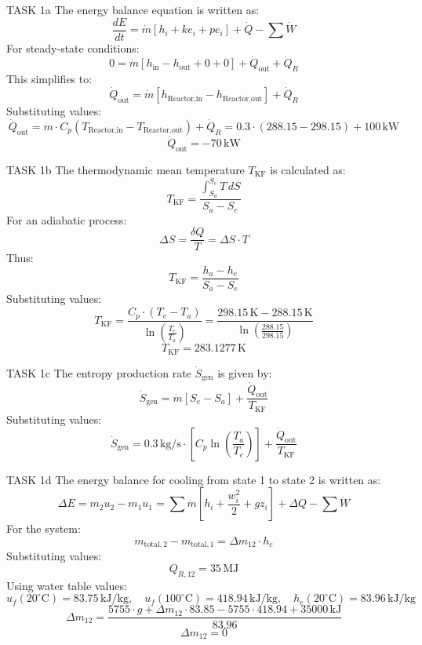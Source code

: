 TASK 1a  
The energy balance equation is written as:  
\[
\frac{dE}{dt} = \dot{m} \left[ h_i + ke_i + pe_i \right] + \dot{Q} - \sum \dot{W}
\]  
For steady-state conditions:  
\[
0 = \dot{m} \left[ h_{\text{in}} - h_{\text{out}} + 0 + 0 \right] + \dot{Q}_{\text{out}} + \dot{Q}_R
\]  
This simplifies to:  
\[
\dot{Q}_{\text{out}} = \dot{m} \left[ h_{\text{Reactor,in}} - h_{\text{Reactor,out}} \right] + \dot{Q}_R
\]  
Substituting values:  
\[
\dot{Q}_{\text{out}} = \dot{m} \cdot C_p \left( T_{\text{Reactor,in}} - T_{\text{Reactor,out}} \right) + \dot{Q}_R = 0.3 \cdot \left( 288.15 - 298.15 \right) + 100 \, \text{kW}
\]  
\[
\dot{Q}_{\text{out}} = -70 \, \text{kW}
\]  

TASK 1b  
The thermodynamic mean temperature \( T_{\text{KF}} \) is calculated as:  
\[
T_{\text{KF}} = \frac{\int_{S_a}^{S_e} T \, dS}{S_a - S_e}
\]  
For an adiabatic process:  
\[
\Delta S = \frac{\delta Q}{T} = \Delta S \cdot T
\]  
Thus:  
\[
T_{\text{KF}} = \frac{h_a - h_e}{S_a - S_e}
\]  
Substituting values:  
\[
T_{\text{KF}} = \frac{C_p \cdot (T_e - T_a)}{\ln \left( \frac{T_e}{T_a} \right)} = \frac{298.15 \, \text{K} - 288.15 \, \text{K}}{\ln \left( \frac{288.15}{298.15} \right)}
\]  
\[
T_{\text{KF}} = 283.1277 \, \text{K}
\]  

TASK 1c  
The entropy production rate \( \dot{S}_{\text{gen}} \) is given by:  
\[
\dot{S}_{\text{gen}} = \dot{m} \left[ S_e - S_a \right] + \frac{\dot{Q}_{\text{out}}}{T_{\text{KF}}}
\]  
Substituting values:  
\[
\dot{S}_{\text{gen}} = 0.3 \, \text{kg/s} \cdot \left[ C_p \ln \left( \frac{T_a}{T_e} \right) \right] + \frac{\dot{Q}_{\text{out}}}{T_{\text{KF}}}
\]  

TASK 1d  
The energy balance for cooling from state 1 to state 2 is written as:  
\[
\Delta E = m_2 u_2 - m_1 u_1 = \sum \dot{m} \left[ h_i + \frac{w_i^2}{2} + g z_i \right] + \Delta Q - \sum \dot{W}
\]  
For the system:  
\[
m_{\text{total},2} - m_{\text{total},1} = \Delta m_{12} \cdot h_e
\]  
Substituting values:  
\[
Q_{R,12} = 35 \, \text{MJ}
\]  
Using water table values:  
\[
u_f (20^\circ\text{C}) = 83.75 \, \text{kJ/kg}, \quad u_f (100^\circ\text{C}) = 418.94 \, \text{kJ/kg}, \quad h_e (20^\circ\text{C}) = 83.96 \, \text{kJ/kg}
\]  
\[
\Delta m_{12} = \frac{5755 \cdot g + \Delta m_{12} \cdot 83.85 - 5755 \cdot 418.94 + 35000 \, \text{kJ}}{83.96}
\]  
\[
\Delta m_{12} = 0
\]